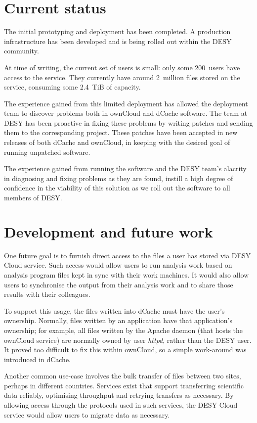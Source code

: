 \documentclass[a4paper]{jpconf}
\begin{document}
\section{Current status}

The initial prototyping and deployment has been completed.  A
production infrastructure has been developed and is being rolled out
within the DESY community.

At time of writing, the current set of users is small: only some
200~users have access to the service.  They currently have around
2~million files stored on the service, consuming some 2.4~TiB of
capacity.

The experience gained from this limited deployment has allowed the
deployment team to discover problems both in ownCloud and dCache
software.  The team at DESY has been proactive in fixing these
problems by writing patches and sending them to the corresponding
project.  These patches have been accepted in new releases of both
dCache and ownCloud, in keeping with the desired goal of running
unpatched software.

The experience gained from running the software and the DESY team's
alacrity in diagnosing and fixing problems as they are found, instill
a high degree of confidence in the viability of this solution as we
roll out the software to all members of DESY.

\section{Development and future work}

One future goal is to furnish direct access to the files a user has
stored via DESY Cloud service.  Such access would allow users to run
analysis work based on analysis program files kept in sync with their
work machines.  It would also allow users to synchronise the output
from their analysis work and to share those results with their
colleagues.

To support this usage, the files written into dCache must have the
user's ownership.  Normally, files written by an application have that
application's ownership; for example, all files written by the Apache
daemon (that hosts the ownCloud service) are normally owned by user
{\em httpd}, rather than the DESY user.  It proved too difficult to
fix this within ownCloud, so a simple work-around was introduced in
dCache.

Another common use-case involves the bulk transfer of files between
two sites, perhaps in different countries.  Services
exist\cite{fts-website}\cite{globus-website} that support transferring
scientific data reliably, optimising throughput and retrying transfers
as necessary.  By allowing access through the protocols used in such
services, the DESY Cloud service would allow users to migrate data as
necessary.
\end{document}
